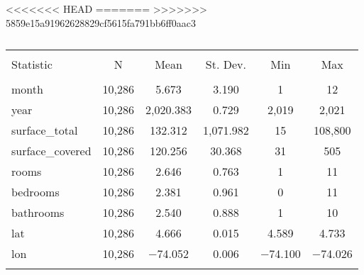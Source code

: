 
<<<<<<< HEAD
=======
>>>>>>> 5859e15a91962628829cf5615fa791bb6ff0aac3
\begin{table}[!htbp] \centering 
  \caption{} 
  \label{} 
\begin{tabular}{@{\extracolsep{5pt}}lccccc} 
\\[-1.8ex]\hline 
\hline \\[-1.8ex] 
Statistic & \multicolumn{1}{c}{N} & \multicolumn{1}{c}{Mean} & \multicolumn{1}{c}{St. Dev.} & \multicolumn{1}{c}{Min} & \multicolumn{1}{c}{Max} \\ 
\hline \\[-1.8ex] 
month & 10,286 & 5.673 & 3.190 & 1 & 12 \\ 
year & 10,286 & 2,020.383 & 0.729 & 2,019 & 2,021 \\ 
surface\_total & 10,286 & 132.312 & 1,071.982 & 15 & 108,800 \\ 
surface\_covered & 10,286 & 120.256 & 30.368 & 31 & 505 \\ 
rooms & 10,286 & 2.646 & 0.763 & 1 & 11 \\ 
bedrooms & 10,286 & 2.381 & 0.961 & 0 & 11 \\ 
bathrooms & 10,286 & 2.540 & 0.888 & 1 & 10 \\ 
lat & 10,286 & 4.666 & 0.015 & 4.589 & 4.733 \\ 
lon & 10,286 & $-$74.052 & 0.006 & $-$74.100 & $-$74.026 \\ 
\hline \\[-1.8ex] 
\end{tabular} 
\end{table} 
